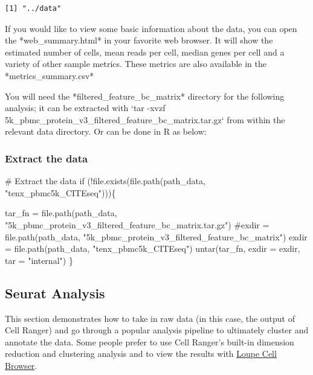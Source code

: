 \documentclass[
  letterpaper,
  DIV=11,
  numbers=noendperiod]{scrartcl}
\newenvironment{Shaded}{\begin{snugshade}}{\end{snugshade}}
\newcommand{\AttributeTok}[1]{\textcolor[rgb]{0.40,0.45,0.13}{#1}}
\newcommand{\CommentTok}[1]{\textcolor[rgb]{0.37,0.37,0.37}{#1}}
\newcommand{\ControlFlowTok}[1]{\textcolor[rgb]{0.00,0.23,0.31}{#1}}
\newcommand{\FunctionTok}[1]{\textcolor[rgb]{0.28,0.35,0.67}{#1}}
\newcommand{\NormalTok}[1]{\textcolor[rgb]{0.00,0.23,0.31}{#1}}
\newcommand{\OtherTok}[1]{\textcolor[rgb]{0.00,0.23,0.31}{#1}}
\newcommand{\SpecialCharTok}[1]{\textcolor[rgb]{0.37,0.37,0.37}{#1}}
\newcommand{\StringTok}[1]{\textcolor[rgb]{0.13,0.47,0.30}{#1}}
\begin{document}
\begin{verbatim}
[1] "../data"
\end{verbatim}

If you would like to view some basic information about the data, you can
open the *web\_summary.html* in your favorite web browser. It will show
the estimated number of cells, mean reads per cell, median genes per
cell and a variety of other sample metrics. These metrics are also
available in the *metrics\_summary.csv*

You will need the *filtered\_feature\_bc\_matrix* directory for the
following analysis; it can be extracted with `tar -xvzf
5k\_pbmc\_protein\_v3\_filtered\_feature\_bc\_matrix.tar.gz` from within
the relevant data directory. Or can be done in R as below:

\hypertarget{extract-the-data}{%
\subsubsection{Extract the data}\label{extract-the-data}}

\begin{Shaded}
\begin{Highlighting}[]
\CommentTok{\# Extract the data}
\ControlFlowTok{if}\NormalTok{ (}\SpecialCharTok{!}\FunctionTok{file.exists}\NormalTok{(}\FunctionTok{file.path}\NormalTok{(path\_data, }\StringTok{"tenx\_pbmc5k\_CITEseq"}\NormalTok{)))\{}

\NormalTok{tar\_fn }\OtherTok{=} \FunctionTok{file.path}\NormalTok{(path\_data, }\StringTok{"5k\_pbmc\_protein\_v3\_filtered\_feature\_bc\_matrix.tar.gz"}\NormalTok{)}
\CommentTok{\#exdir = file.path(path\_data, "5k\_pbmc\_protein\_v3\_filtered\_feature\_bc\_matrix")}
\NormalTok{exdir }\OtherTok{=} \FunctionTok{file.path}\NormalTok{(path\_data, }\StringTok{"tenx\_pbmc5k\_CITEseq"}\NormalTok{)}
\FunctionTok{untar}\NormalTok{(tar\_fn, }\AttributeTok{exdir =}\NormalTok{ exdir, }\AttributeTok{tar =} \StringTok{"internal"}\NormalTok{)}
\NormalTok{\}}
\end{Highlighting}
\end{Shaded}

\hypertarget{seurat-analysis}{%
\subsection{Seurat Analysis}\label{seurat-analysis}}

This section demonstrates how to take in raw data (in this case, the
output of Cell Ranger) and go through a popular analysis pipeline to
ultimately cluster and annotate the data. Some people prefer to use Cell
Ranger's built-in dimension reduction and clustering analysis and to
view the results with
\href{https://support.10xgenomics.com/single-cell-gene-expression/software/visualization/latest/what-is-loupe-cell-browser}{Loupe
Cell Browser}.
\end{document}
